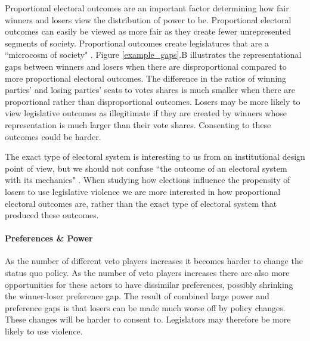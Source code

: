 \documentclass[a4paper]{article}\usepackage{graphicx, color}
\begin{document}
Proportional electoral outcomes are an important factor determining how fair winners and losers view the distribution of power to be. Proportional electoral outcomes can easily be viewed as more fair as they create fewer unrepresented segments of society. Proportional outcomes create legislatures that are a ``microcosm of society" \citep{Carey2011}. Figure \ref{example_gaps}.B illustrates the representational gaps between winners and losers when there are disproportional compared to more proportional electoral outcomes.  The difference in the ratios of winning parties' and losing parties' seats to votes shares is much smaller when there are proportional rather than disproportional outcomes. Losers may be more likely to view legislative outcomes as illegitimate if they are created by winners whose representation is much larger than their vote shares. Consenting to these outcomes could be harder.

The exact type of electoral system is interesting to us from an institutional design point of view, but we should not confuse ``the outcome of an electoral system with its mechanics" \citep[][109]{Golder2005}. When studying how elections influence the propensity of losers to use legislative violence we are more interested in how proportional electoral outcomes are, rather than the exact type of electoral system that produced these outcomes. 

\paragraph{Preferences \& Power}

As the number of different veto players increases it becomes harder to change the status quo policy. As the number of veto players increases there are also more opportunities for these actors to have dissimilar preferences, possibly shrinking the winner-loser preference gap. The result of combined large power and preference gaps is that losers can be made much worse off by policy changes. These changes will be harder to consent to. Legislators may therefore be more likely to use violence.
\end{document}
